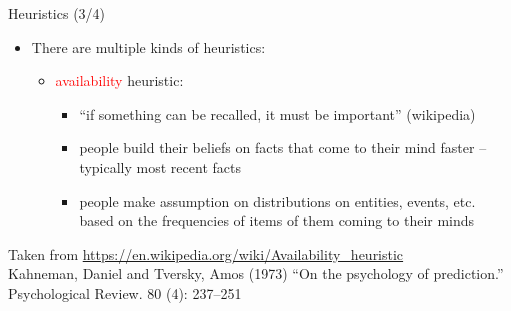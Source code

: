 \documentclass{beamer}
\begin{document}
\begin{frame}
{\centerline{Heuristics (3/4)}}
\begin{itemize}
    \item There are multiple kinds of heuristics:
                 \begin{itemize}
        \item \textcolor{red}{availability} heuristic:
             \begin{itemize}
                       \item ``if something can be recalled, it must be important'' (wikipedia)
                       \item people build their beliefs on facts that come to their mind faster -- typically most recent facts
                       \item people make assumption on distributions on entities, events, etc. based on the frequencies of items of them coming to their minds
             \end{itemize} 
   \end{itemize} 
\end{itemize} 
\begin{center}
    \tiny{Taken from \url{https://en.wikipedia.org/wiki/Availability_heuristic} \\
    Kahneman, Daniel and Tversky, Amos (1973) ``On the psychology of prediction.'' Psychological Review. 80 (4): 237–251}
\end{center}

\end{frame}
\end{document}
